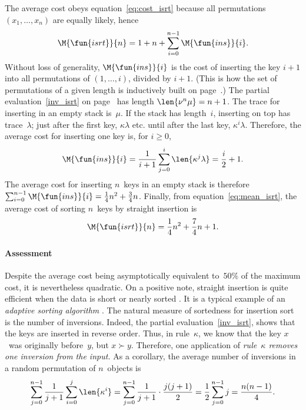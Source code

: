 The average cost obeys equation~\eqref{eq:cost_isrt} because all
permutations \((x_1,\dots,x_n)\) are equally likely, hence
\begin{equation}
\M{\fun{isrt}}{n} = 1 + n + \sum_{i=0}^{n-1}\M{\fun{ins}}{i}.
\label{eq:mean_isrt}
\end{equation}
Without loss of generality,
\(\M{\fun{ins}}{i}\) is the cost of
inserting the key \(i+1\) into all permutations of \((1,\dots,i)\),
divided by \(i+1\). (This is how the set of
permutations of a given length is inductively built
on page~\pageref{par:permutations}.)  The partial
evaluation~\eqref{inv_isrt} on page~\pageref{inv_isrt} has
length \(\len{\nu^n\mu}=n+1\). The trace for inserting in an empty
stack is~\(\mu\). If the stack has length~\(i\), inserting on top has
trace~\(\lambda\); just after the first key, \(\kappa\lambda\)
etc. until after the last key, \(\kappa^i\lambda\). Therefore, the
average cost for inserting one key is, for \(i \geqslant 0\),
\begin{equation}
\M{\fun{ins}}{i} = \frac{1}{i+1}\sum_{j=0}^{i}\len{\kappa^j\lambda}
                 = \frac{i}{2}+1.
\label{eq:ins}
\end{equation}
The average cost for inserting \(n\)~keys in an empty stack is
therefore \(\sum_{i=0}^{n-1}\M{\fun{ins}}{i} = \frac{1}{4}n^2 +
\frac{3}{4}n\). Finally, from equation~\eqref{eq:mean_isrt}, the
average cost of sorting \(n\)~keys by straight insertion is
\begin{equation*}
\M{\fun{isrt}}{n} = \frac{1}{4}n^2 + \frac{7}{4}n + 1.
\end{equation*}

\paragraph{Assessment}

Despite the average cost being asymptotically equivalent to~\(50\%\)
of the maximum cost, it is nevertheless quadratic. On a positive note,
straight insertion is quite efficient when the data is short or nearly
sorted \citep{CookKim_1980}. It is a typical example of an
\emph{adaptive sorting algorithm}
\citep{EstivillWood_1992,MoffatPetersson_1992}. The natural measure of sortedness for insertion sort
is the number of inversions. Indeed, the partial
evaluation~\eqref{inv_isrt},  shows that the keys
are inserted in reverse order. Thus, in rule~\(\kappa\), we know that
the key \(x\)~was originally before~\(y\), but \(x \succ
y\). Therefore, one application of \emph{rule~\(\kappa\) removes one
  inversion from the input.} As a corollary, the average number of
inversions in a random permutation of \(n\)~objects is
\begin{equation*}
\belowdisplayskip=-4pt
\sum_{j=0}^{n-1}\frac{1}{j+1}\sum_{i=0}^{j}\len{\kappa^i} =
\sum_{j=0}^{n-1}\frac{1}{j+1}\cdot\frac{j(j+1)}{2} =
\frac{1}{2}\sum_{j=0}^{n-1}j =
\frac{n(n-1)}{4}.
\end{equation*}

